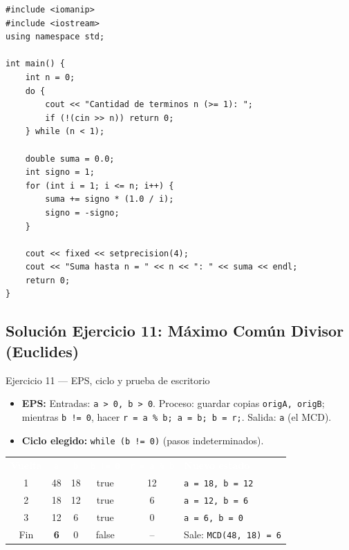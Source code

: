 \documentclass[11pt,letterpaper]{article}
\begin{document}
\begin{lstlisting}[style=cppmonitoria,caption={Solución Ejercicio 10: Serie alternante de fracciones (C++)}]
#include <iomanip>
#include <iostream>
using namespace std;

int main() {
    int n = 0;
    do {
        cout << "Cantidad de terminos n (>= 1): ";
        if (!(cin >> n)) return 0;
    } while (n < 1);

    double suma = 0.0;
    int signo = 1;
    for (int i = 1; i <= n; i++) {
        suma += signo * (1.0 / i);
        signo = -signo;
    }

    cout << fixed << setprecision(4);
    cout << "Suma hasta n = " << n << ": " << suma << endl;
    return 0;
}
\end{lstlisting}

\subsection{Solución Ejercicio 11: Máximo Común Divisor (Euclides)}

\begin{solucion}{Ejercicio 11 --- EPS, ciclo y prueba de escritorio}
\begin{itemize}
  \item \textbf{EPS:} Entradas: \texttt{a > 0, b > 0}. Proceso: guardar copias \texttt{origA, origB}; mientras \texttt{b != 0}, hacer \texttt{r = a \% b; a = b; b = r;}. Salida: \texttt{a} (el MCD).
  \item \textbf{Ciclo elegido:} \texttt{while (b != 0)} (pasos indeterminados).
\end{itemize}
\begin{center}
\footnotesize
\renewcommand{\arraystretch}{1.15}
\begin{tabularx}{0.88\linewidth}{c c c c c X}
\rowcolor{AzulMarino}
\textcolor{white}{\textbf{Vuelta}} & \textcolor{white}{\texttt{a}} & \textcolor{white}{\texttt{b}} & \textcolor{white}{\texttt{b != 0}} & \textcolor{white}{\texttt{r = a \% b}} & \textcolor{white}{\textbf{Nuevo estado}} \\
1 & 48 & 18 & true & 12 & \texttt{a = 18, b = 12} \\
2 & 18 & 12 & true & 6 & \texttt{a = 12, b = 6} \\
3 & 12 & 6 & true & 0 & \texttt{a = 6, b = 0} \\
Fin & \textbf{6} & 0 & false & -- & Sale: \texttt{MCD(48, 18) = 6} \\
\bottomrule
\end{tabularx}
\end{center}
\end{solucion}
\end{document}

